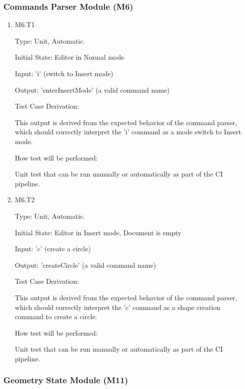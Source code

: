 \documentclass[12pt, titlepage]{article}
\begin{document}
\subsubsection{Commands Parser Module (M6)}

\begin{enumerate}

\item{M6.T1\\}

Type: Unit, Automatic.

Initial State: Editor in Normal mode

Input: 'i' (switch to Insert mode)

Output: 'enterInsertMode' (a valid command name)

Test Case Derivation:

This output is derived from the expected behavior of the command parser, which
    should correctly interpret the 'i' command as a mode switch to Insert mode.

How test will be performed:

Unit test that can be run manually or automatically as part of the CI pipeline.

\item{M6.T2\\}

Type: Unit, Automatic.

Initial State: Editor in Insert mode, Document is empty

Input: 'c' (create a circle)

Output: 'createCircle' (a valid command name)

Test Case Derivation:

This output is derived from the expected behavior of the command parser, which
    should correctly interpret the 'c' command as a shape creation command to create a circle.

How test will be performed:

Unit test that can be run manually or automatically as part of the CI pipeline.

\end{enumerate}

\subsubsection{Geometry State Module (M11)}
\end{document}
